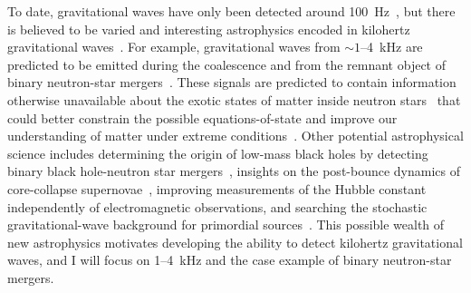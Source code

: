 To date, gravitational waves have only been detected around 100~Hz~\cite{}, but there is believed to be varied and interesting astrophysics encoded in kilohertz gravitational waves~\cite{}.
For example, gravitational waves from $\sim1$--4~kHz are predicted to be emitted during the coalescence and from the remnant object of binary neutron-star mergers~\cite{}.
These signals are predicted to contain information otherwise unavailable about the exotic states of matter inside neutron stars~\cite{} that could better constrain the possible equations-of-state and improve our understanding of matter under extreme conditions~\cite{miaoDesignGravitationalWaveDetectors2018,}. %
Other potential astrophysical science includes determining the origin of low-mass black holes by detecting binary black hole-neutron star mergers~\cite{}, insights on the post-bounce dynamics of core-collapse supernovae~\cite{}, improving measurements of the Hubble constant independently of electromagnetic observations, and searching the stochastic gravitational-wave background for primordial sources~\cite{miaoDesignGravitationalWaveDetectors2018}.
This possible wealth of new astrophysics motivates developing the ability to detect kilohertz gravitational waves, and I will focus on 1--4~kHz and the case example of binary neutron-star mergers.



